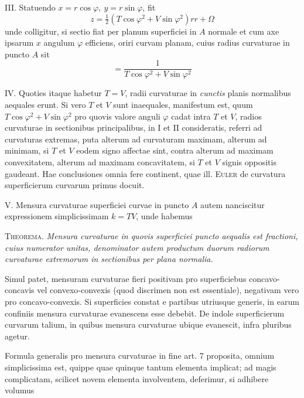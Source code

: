 \par\indent{}%
III. Statuendo \(x=r\cos\varphi,\ y=r\sin\varphi\), fit
\[
z=\tfrac{1}{2}(T\cos\varphi^2+V\sin\varphi^2)rr+\Omega
\]
unde colligitur, si sectio fiat per planum superficiei in \(A\) normale et cum axe ipsarum \(x\) angulum \(\varphi\) efficiens, oriri curvam planam, cuius radius curvaturae in puncto \(A\) sit
\[
=\frac{1}{T\cos\varphi^2+V\sin\varphi^2}
\]
\par\indent IV. Quoties itaque habetur \(T=V\), radii curvaturae in \textit{cunctis} planis normalibus aequales erunt. Si vero \(T\) et \(V\) sunt inaequales, manifestum est, quum \(T\cos\varphi^2+V\sin\varphi^2\) pro quovis valore anguli \(\varphi\) cadat intra \(T\) et \(V\), radios curvaturae in sectionibus principalibus, in I et II consideratis, referri ad curvaturas extremas, puta alterum ad curvaturam maximam, alterum ad minimam, si \(T\) et \(V\) eodem signo affectae sint, contra alterum ad maximam convexitatem, alterum ad maximam concavitatem, si \(T\) et \(V\) signis oppositis gaudeant. Hae conclusiones omnia fere continent, quae ill. \textsc{Euler} de curvatura superficierum curvarum primus docuit.

V. Mensura curvaturae superficiei curvae in puncto \(A\) autem nanciscitur expressionem simplicissimam \(k=TV\), unde habemus

\textsc{Theorema.} \textit{Mensura curvaturae in quovis superficiei puncto aequalis est fractioni, cuius numerator unitas, denominator autem productum duorum radiorum curvaturae extremorum in sectionibus per plana normalia.}

Simul patet, mensuram curvaturae fieri positivam pro superficiebus concavo-concavis vel convexo-convexis (quod discrimen non est essentiale), negativam vero pro concavo-convexis. Si superficies constat e partibus utriusque generis, in earum confiniis mensura curvaturae evanescens esse debebit. De indole superficierum curvarum talium, in quibus mensura curvaturae ubique evanescit, infra pluribus agetur.

Formula generalis pro mensura curvaturae in fine art. 7 proposita, omnium simplicissima est, quippe quae quinque tantum elementa implicat; ad magis complicatam, scilicet novem elementa involventem, deferimur, si adhibere volumus
